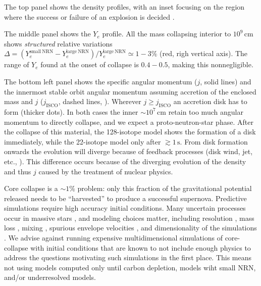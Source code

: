 \documentclass[twocolumn]{aastex63}
\begin{document}
The top panel shows the density profiles, with an inset focusing on
the region where the success or failure of an explosion is decided
\citep[e.g.,][]{ertl:16, boccioli:23, burrows:23}.

The middle panel shows the $Y_e$ profile. All the mass collapsing
interior to $10^9\,\mathrm{cm}$ shows \emph{structured} relative
variations
$\Delta=(Y_e^\mathrm{small\ NRN}-Y_e^\mathrm{large\
  NRN})/Y_e^\mathrm{large\ NRN}\simeq 1-3\%$ (red, righ vertical
axis). The range of $Y_e$ found at the onset of collapse is $0.4-0.5$,
making this nonnegligible. %

The bottom left panel shows the specific angular momentum ($j$, solid
lines) and the innermost stable orbit angular momentum assuming
accretion of the enclosed mass and $j$ ($j_\mathrm{ISCO}$, dashed
lines, \citealt{bardeen:72}). Wherever $j\geq j_\mathrm{ISCO}$ an
accretion disk has to form (thicker dots). In both cases the inner
$\sim{}10^{7}\,\mathrm{cm}$ retain too much angular momentum to
directly collapse, and we expect a proto-neutron-star phase. After the
collapse of this material, the 128-isotope model shows the formation
of a disk immediately, while the 22-isotope model only after
$\gtrsim 1\,\mathrm{s}$. From disk formation onwards the evolution
will diverge because of feedback processes (disk wind, jet, etc.,
\citealt{gottlieb:22}). This difference occurs because of the
diverging evolution of the density and thus $j$ caused by the
treatment of nuclear physics.


Core collapse is a $\sim{}1\%$ problem: only this fraction of the
gravitational potential released %
needs to be ``harvested'' %
to produce a successful supernova. Predictive %
simulations require high accuracy initial conditions. Many uncertain
processes occur in massive stars \citep[e.g.,][]{woosley:02,
  langer:12}, and modeling choices matter, including resolution
\citep{farmer:16}, mass loss \citep{renzo:17}, mixing
\citep{davis:19}, spurious envelope velocities
\citep[e.g.,][]{farmer:16, aguilera-dena:18}, and dimensionality of
the simulations \citep[e.g.,][]{fields:22}. We advise against running
expensive multidimensional simulations of core-collapse with initial
conditions that are known to not include enough physics to address the
questions motivating such simulations in the first place. This means
not using models computed only until carbon depletion, models wiht
small NRN, and/or underresolved
models. %
\end{document}
